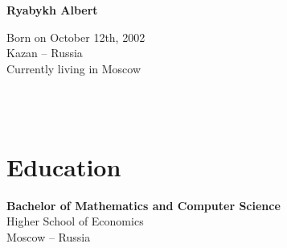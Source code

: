 \documentclass[a4paper,8pt]{article}
\begin{document}
\thispagestyle{empty}

\begin{adjustbox}{valign=t}
\begin{minipage}{0.3\textwidth} %
\begin{center}

\MySkip 	%

{\LARGE \bfseries Ryabykh Albert}

\MySkip 	%

Born on October 12th, 2002\\
Kazan -- Russia\\
Currently living in Moscow\\

\MySkip 	%

\textcolor{ColorTwo}{\faEnvelopeO} 
 \\
 \\

\end{center}

\vfill

\section*{Education}
	\begin{description}
	\raggedright
	\item [\normalfont \textcolor{ColorOne}{Sep 2020 --- Jul 2024}] \textbf{Bachelor of Mathematics and Computer Science} \\
	Higher School of Economics\\
	Moscow -- Russia
\end{description}

\vfill
\end{minipage}
\end{adjustbox}
%
%
\end{document}
